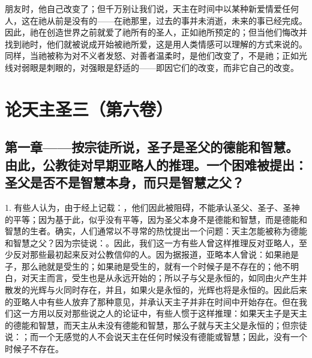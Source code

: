 朋友时，他自己改变了；但千万别让我们说，天主在时间中以某种新爱情爱任何人，这在祂从前是没有的——在祂那里，过去的事并未消逝，未来的事已经完成。因此，祂在创造世界之前就爱了祂所有的圣人，正如祂所预定的；但当他们悔改并找到祂时，他们就被说成开始被祂所爱，这是用人类情感可以理解的方式来说的。同样，当祂被称为对不义者发怒、对善者温柔时，是他们改变了，不是祂；正如光线对弱眼是刺眼的，对强眼是舒适的——即因它们的改变，而非它自己的改变。\par



\section{论天主圣三（第六卷）}

\par


\subsection{第一章——按宗徒所说，圣子是圣父的德能和智慧。由此，公教徒对早期亚略人的推理。一个困难被提出：圣父是否不是智慧本身，而只是智慧之父？}

1. 有些人认为，由于经上记载：，他们因此被阻碍，不能承认圣父、圣子、圣神的平等；因为基于此，似乎没有平等，因为圣父本身不是德能和智慧，而是德能和智慧的生者。确实，人们通常以不寻常的热忱提出一个问题：天主怎能被称为德能和智慧之父？因为宗徒说：。因此，我们这一方有些人曾这样推理反对亚略人，至少反对那些最初起来反对公教信仰的人。因为据报道，亚略本人曾说：如果祂是子，那么祂就是受生的；如果祂是受生的，就有一个时候子是不存在的；他不明白，对天主而言，受生也是从永远开始的；所以子与父是永恒的，如同由火产生并散发的光辉与火同时存在，并且，如果火是永恒的，光辉也将是永恒的。因此后来的亚略人中有些人放弃了那种意见，并承认天主子并非在时间中开始存在。但在我们这一方用以反对那些说之人的论证中，有些人惯于这样推理：如果天主子是天主的德能和智慧，而天主从未没有德能和智慧，那么子就与天主父是永恒的；但宗徒说：；而一个无感觉的人不会说天主在任何时候没有德能或智慧；因此，没有一个时候子不存在。\par

